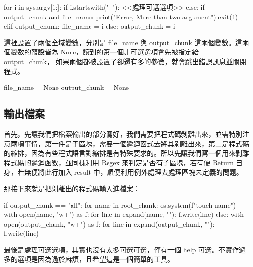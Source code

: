 \documentclass[12pt, a4paper]{NGPLB}
\begin{document}
\begin{mylisting}
for i in sys.argv[1:]:
	if i.startswith("--"):
		<<處理可選選項>>
	else:
		if output_chunk and file_name:
			print("Error, More than two argument")
			exit(1)
		elif output_chunk:
			file_name = i
		else:
			output_chunk = i
\end{mylisting}


這裡設置了兩個全域變數，分別是 file\_name 與 output\_chunk 這兩個變數。這兩個變數的預設皆為 None，讀到的第一個非可選選項會先被指定給 output\_chunk， 如果兩個都被設置了卻還有多的參數，就會跳出錯誤訊息並關閉程式。


\begin{mylisting}
file_name = None
output_chunk = None
\end{mylisting}


\subsection{輸出檔案}

首先，先讓我們把檔案輸出的部分寫好，我們需要把程式碼剝離出來，並需特別注意兩項事情，第一件是子區塊，需要一個遞迴函式去將其剝離出來，第二是程式碼的縮排，因為有些程式語言對縮排是有特殊要求的。所以先讓我們寫一個用來剝離程式碼的遞迴函數，並同樣利用 Regex 來判定是否有子區塊，若有便 Return 自身，若無便將此行加入 result 中，順便利用例外處理去處理區塊未定義的問題。




那接下來就是把剝離出的程式碼輸入進檔案：


\begin{mylisting}
if output_chunk == "all":
	for name in root_chunk:
		os.system(f"touch {name}")
		with open(name, "w+") as f:
			for line in expand(name, ""):
				f.write(line)
else:
	with open(output_chunk, "w+") as f:
		for line in expand(output_chunk, ""):
			f.write(line)
\end{mylisting}


最後是處理可選選項，其實也沒有太多可選可選，僅有一個 help 可選。不實作過多的選項是因為過於麻煩，且希望這是一個簡單的工具。
\end{document}
